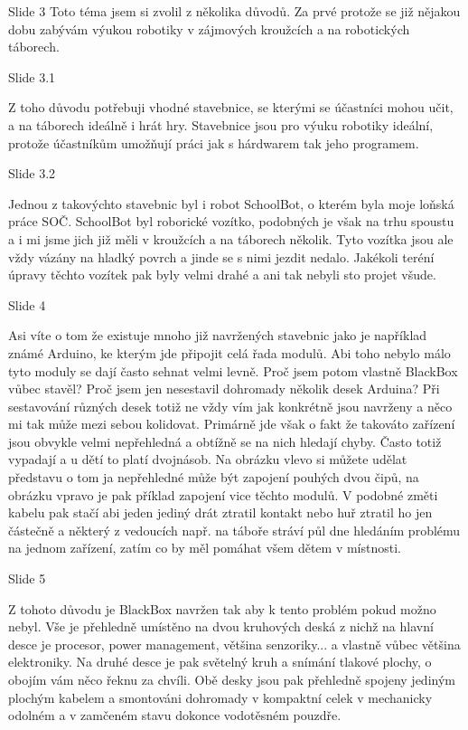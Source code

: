 
Slide 3 
Toto téma jsem si zvolil z několika důvodů. Za prvé protože se již nějakou dobu zabývám 
výukou robotiky v zájmových kroužcích a na robotických táborech. 

    Slide 3.1

    Z toho důvodu potřebuji 
    vhodné stavebnice, se kterými se účastníci mohou učit, a na táborech ideálně i hrát hry.
    Stavebnice jsou pro výuku robotiky ideální, protože účastníkům umožňují práci jak 
    s hárdwarem tak jeho programem.

    Slide 3.2

    Jednou z takovýchto stavebnic byl i robot SchoolBot, o kterém byla moje loňská práce SOČ.
    SchoolBot byl roborické vozítko, podobných je však na trhu spoustu a i mi jsme jich již měli v kroužcích
    a na táborech několik. Tyto vozítka jsou ale vždy vázány na hladký povrch a jinde se s nimi jezdit nedalo.
    Jakékoli teréní úpravy těchto vozítek pak byly velmi drahé a ani tak nebyli sto projet všude.


Slide 4

Asi víte o tom že existuje mnoho již navržených stavebnic jako je například známé Arduino, 
ke kterým jde připojit celá řada modulů. Abi toho nebylo málo tyto moduly se dají často sehnat velmi levně. 
Proč jsem potom vlastně BlackBox vůbec stavěl? Proč jsem jen nesestavil dohromady několik desek Arduina? 
Při sestavování různých desek
totiž ne vždy vím jak konkrétně jsou navrženy a něco mi tak může mezi sebou kolidovat.
Primárně jde však o fakt že takováto zařízení jsou obvykle velmi nepřehledná a obtížně 
se na nich hledají chyby. Často totiž vypadají a u dětí to platí dvojnásob.
Na obrázku vlevo si můžete udělat představu o tom ja nepřehledné může být zapojení pouhých dvou čipů, 
na obrázku vpravo je pak příklad zapojení vice těchto modulů. V podobné změti kabelu pak stačí abi jeden jediný drát 
ztratil kontakt nebo huř ztratil ho jen částečně a některý z vedoucích např. na táboře stráví půl dne hledáním problému 
na jednom zařízení, zatím co by měl pomáhat všem dětem v místnosti.


Slide 5

Z tohoto důvodu je BlackBox navržen tak aby k tento problém pokud možno nebyl. 
Vše je přehledně umístěno na dvou kruhových deská z nichž na hlavní desce je procesor, power management, většina
senzoriky... a vlastně vůbec většina elektroniky. Na druhé desce je pak světelný kruh a snímání tlakové plochy, 
o obojím vám něco řeknu za chvíli.
Obě desky jsou pak přehledně spojeny jediným plochým kabelem a smontováni dohromady v kompaktní celek 
v mechanicky odolném a v zamčeném stavu dokonce vodotěsném pouzdře. %

